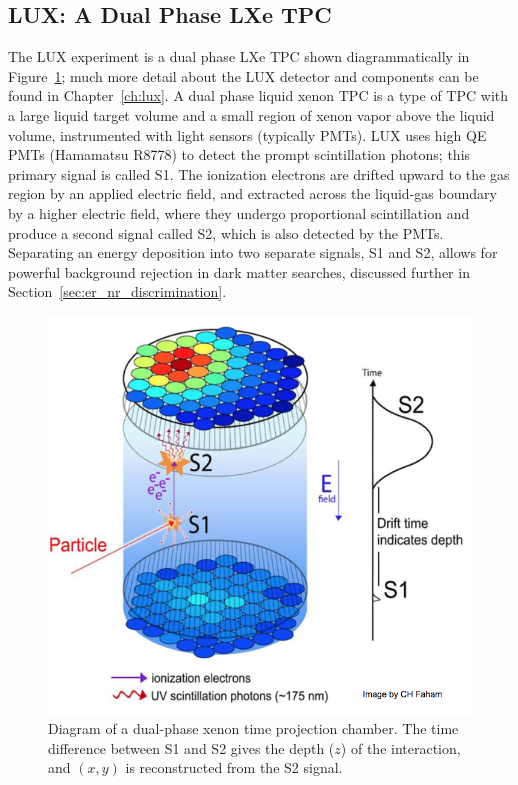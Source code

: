 \FloatBarrier
\subsection{LUX: A Dual Phase LXe TPC}
The \ac{LUX} experiment is a dual phase \ac{LXe} \ac{TPC} shown diagrammatically in Figure~\ref{fig:tpc}; much more detail about the \ac{LUX} detector and components can be found in Chapter~\ref{ch:lux}. A dual phase liquid xenon \ac{TPC} is a type of \ac{TPC} with a large liquid target volume and a small region of xenon vapor above the liquid volume, instrumented with light sensors (typically \ac{PMT}s). \ac{LUX} uses high \ac{QE} \ac{PMT}s (Hamamatsu R8778) to detect the prompt scintillation photons; this primary signal is called S1. The ionization electrons are drifted upward to the gas region by an applied electric field, and extracted across the liquid-gas boundary by a higher electric field, where they undergo proportional scintillation and produce a second signal called S2, which is also detected by the \ac{PMT}s. Separating an energy deposition into two separate signals, S1 and S2, allows for powerful background rejection in dark matter searches, discussed further in Section~\ref{sec:er_nr_discrimination}. 

\begin{figure}[htbp]
\begin{center}
\includegraphics[width=\textwidth]{figures/lxetpcs/TPC.png}
\caption{ Diagram of a dual-phase xenon time projection chamber. The time difference between S1 and S2 gives the depth ($z$) of the interaction, and $(x,y)$ is reconstructed from the S2 signal.}
\label{fig:tpc}
\end{center}
\end{figure}

